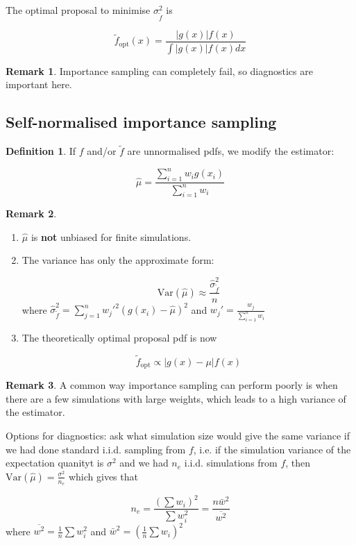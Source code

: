 \documentclass[12pt,a4paper]{article}
\theoremstyle{definition}
\newtheorem{definition}{Definition}[subsection]
\newtheorem*{remark}{Remark}
\begin{document}
The optimal proposal to minimise $\sigma_{\tilde{f}}^2$ is

\[ \tilde{f}_{\text{opt}} (x) = \frac{|g(x)| f(x)}{\int |g(x)| f(x) dx} \]

\begin{remark}
	Importance sampling can completely fail, so diagnostics are important here.
\end{remark}

\subsection{Self-normalised importance sampling}

\begin{definition}
	If $f$ and/or $\tilde{f}$ are unnormalised pdfs, we modify the estimator:

	\[ \hat{\mu} = \frac{\sum_{i = 1}^n w_i g(x_i)}{\sum_{i = 1}^n w_i} \]
\end{definition}

\begin{remark}
	\hfill
	\begin{enumerate}
		\item $\hat{\mu}$ is \textbf{not} unbiased for finite simulations.
		\item The variance has only the approximate form:
		
		\[ \text{Var}(\hat{\mu}) \approx \frac{\hat{\sigma}_{\tilde{f}}^2}{n} \]
		where $\hat{\sigma}_{\tilde{f}}^2 = \sum_{j = 1}^n w_j'^2 (g(x_i) - \hat{\mu})^2$ and $w_j' = \frac{w_j}{\sum_{i = 1}^n w_i}$
		\item The theoretically optimal proposal pdf is now
		
		\[ \tilde{f}_{\text{opt}} \propto |g(x) - \mu| f(x) \]
	\end{enumerate}
\end{remark}

\begin{remark}
	A common way importance sampling can perform poorly is when there are a few simulations with large weights, which leads to a high variance of the estimator.
	
	Options for diagnostics: ask what simulation size would give the same variance if we had done standard i.i.d. sampling from $f$, i.e. if the simulation variance of the expectation quanityt is $\sigma^2$ and we had $n_e$ i.i.d. simulations from $f$, then $\text{Var}(\hat{\mu}) = \frac{\sigma^2}{n_e}$ which gives that

	\[ n_e = \frac{{\left(\sum w_i \right)}^2}{\sum w_i^2} = \frac{n \bar{w}^2}{\overline{w^2}} \]
	where $\overline{w^2} = \frac{1}{n} \sum w_i^2$ and $\bar{w}^2 = {\left(\frac{1}{n} \sum w_i\right)}^2$
\end{remark}
\end{document}
